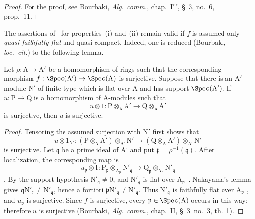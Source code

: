 \begin{proof}
For the proof, see Bourbaki, \emph{Alg.\ comm.}, chap.~I\textsuperscript{er}, \S~3, no.~6, prop.~11.
\end{proof}

\begin{remark}[2.5.4]
\label{IV.2.5.4}
The assertions of~ for properties~(i) and~(ii) remain
valid if $f$ is assumed only \emph{quasi-faithfully flat}
 and quasi-compact. Indeed, one is reduced (Bourbaki,
\emph{loc.\ cit.}) to the following lemma.
\end{remark}

\begin{lemma}[2.5.4.1]
\label{IV.2.5.4.1}
Let $\rho:\mathrm{A}\to\mathrm{A}'$ be a homomorphism of rings such that
the corresponding morphism
$f:\Spec(\mathrm{A}')\to\Spec(\mathrm{A})$ is surjective. Suppose that
there is an $\mathrm{A}'$-module $\mathrm{N}'$ of finite type which is
flat over $\mathrm{A}$ and has support $\Spec(\mathrm{A}')$. If
$u:\mathrm{P}\to\mathrm{Q}$ is a homomorphism of $\mathrm{A}$-modules
such that
\[
  u\otimes 1:
  \mathrm{P}\otimes_{\mathrm{A}}\mathrm{A}'
  \longrightarrow
  \mathrm{Q}\otimes_{\mathrm{A}}\mathrm{A}'
\]
is surjective, then $u$ is surjective.
\end{lemma}

\begin{proof}
Tensoring the assumed surjection with $\mathrm{N}'$ first shows that
\[
  u\otimes 1_{\mathrm{N}'}:
  (\mathrm{P}\otimes_{\mathrm{A}}\mathrm{A}')
    \otimes_{\mathrm{A}'}\mathrm{N}'
  \longrightarrow
  (\mathrm{Q}\otimes_{\mathrm{A}}\mathrm{A}')
    \otimes_{\mathrm{A}'}\mathrm{N}'
\]
is surjective. Let $\mathfrak{q}$ be a prime ideal of $\mathrm{A}'$ and
put $\mathfrak{p}=\rho^{-1}(\mathfrak{q})$. After localization, the
corresponding map is
\[
  u_{\mathfrak{p}}\otimes 1:
  \mathrm{P}_{\mathfrak{p}}
    \otimes_{\mathrm{A}_{\mathfrak{p}}}\mathrm{N}'_{\mathfrak{q}}
  \longrightarrow
  \mathrm{Q}_{\mathfrak{p}}
    \otimes_{\mathrm{A}_{\mathfrak{p}}}\mathrm{N}'_{\mathfrak{q}}
\]
. By the support hypothesis
$\mathrm{N}'_{\mathfrak{q}}\neq0$, and
$\mathrm{N}'_{\mathfrak{q}}$ is flat over
$\mathrm{A}_{\mathfrak{p}}$~. Nakayama's lemma gives
$\mathfrak{q}\mathrm{N}'_{\mathfrak{q}}\neq
\mathrm{N}'_{\mathfrak{q}}$, hence a fortiori
$\mathfrak{p}\mathrm{N}'_{\mathfrak{q}}\neq
\mathrm{N}'_{\mathfrak{q}}$. Thus $\mathrm{N}'_{\mathfrak{q}}$ is
faithfully flat over $\mathrm{A}_{\mathfrak{p}}$
, and $u_{\mathfrak{p}}$ is surjective. Since $f$ is
surjective, every $\mathfrak{p}\in\Spec(\mathrm{A})$ occurs in this way;
therefore $u$ is surjective (Bourbaki, \emph{Alg.\ comm.}, chap.~II,
\S~3, no.~3, th.~1).
\end{proof}

